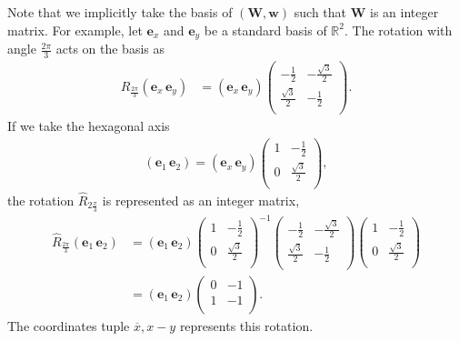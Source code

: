 Note that we implicitly take the basis of $(\bm{W}, \bm{w})$ such that $\bm{W}$ is an integer matrix.
For example, let $\bm{e}_{x}$ and $\bm{e}_{y}$ be a standard basis of $\mathbb{R}^{2}$.
The rotation with angle $\frac{2\pi}{3}$ acts on the basis as
\begin{align*}
  \hat{R}_{\frac{2\pi}{3}} ( \bm{e}_{x} \, \bm{e}_{y} )
    &= ( \bm{e}_{x} \, \bm{e}_{y} )
      \begin{pmatrix}
          -\frac{1}{2} & -\frac{\sqrt{3}}{2} \\
          \frac{\sqrt{3}}{2} & -\frac{1}{2} \\
      \end{pmatrix}.
\end{align*}
If we take the hexagonal axis
\begin{align*}
  ( \bm{e}_{1} \, \bm{e}_{2}) = ( \bm{e}_{x} \, \bm{e}_{y} )
    \begin{pmatrix}
      1 & -\frac{1}{2} \\
      0 & \frac{\sqrt{3}}{2} \\
    \end{pmatrix},
\end{align*}
the rotation $\hat{R}_{2\frac{\pi}{3}}$ is represented as an integer matrix,
\begin{align*}
  \hat{R}_{\frac{2\pi}{3}} ( \bm{e}_{1} \, \bm{e}_{2} )
    &= ( \bm{e}_{1} \, \bm{e}_{2} )
    \begin{pmatrix}
      1 & -\frac{1}{2} \\
      0 & \frac{\sqrt{3}}{2} \\
    \end{pmatrix}^{-1}
    \begin{pmatrix}
      -\frac{1}{2} & -\frac{\sqrt{3}}{2} \\
      \frac{\sqrt{3}}{2} & -\frac{1}{2} \\
    \end{pmatrix}
    \begin{pmatrix}
      1 & -\frac{1}{2} \\
      0 & \frac{\sqrt{3}}{2} \\
    \end{pmatrix} \\
    &= ( \bm{e}_{1} \, \bm{e}_{2} )
    \begin{pmatrix}
      0 & -1 \\
      1 & -1 \\
    \end{pmatrix}.
\end{align*}
The coordinates tuple $\overline{x},x-y$ represents this rotation.

